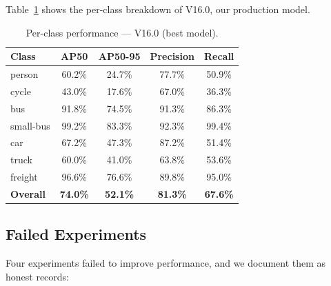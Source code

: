 \documentclass[11pt]{article}
\begin{document}
Table~\ref{tab:perclass} shows the per-class breakdown of V16.0, our production model.

\begin{table}[H]
\centering
\caption{Per-class performance — V16.0 (best model).}
\label{tab:perclass}
\begin{tabular}{lcccc}
\toprule
Class & AP50 & AP50-95 & Precision & Recall \\
\midrule
person    & 60.2\% & 24.7\% & 77.7\% & 50.9\% \\
cycle     & 43.0\% & 17.6\% & 67.0\% & 36.3\% \\
bus       & 91.8\% & 74.5\% & 91.3\% & 86.3\% \\
small-bus & 99.2\% & 83.3\% & 92.3\% & 99.4\% \\
car       & 67.2\% & 47.3\% & 87.2\% & 51.4\% \\
truck     & 60.0\% & 41.0\% & 63.8\% & 53.6\% \\
freight   & 96.6\% & 76.6\% & 89.8\% & 95.0\% \\
\midrule
\textbf{Overall} & \textbf{74.0\%} & \textbf{52.1\%} & \textbf{81.3\%} & \textbf{67.6\%} \\
\bottomrule
\end{tabular}
\end{table}

\subsection{Failed Experiments}

Four experiments failed to improve performance, and we document them as honest records:
\end{document}
